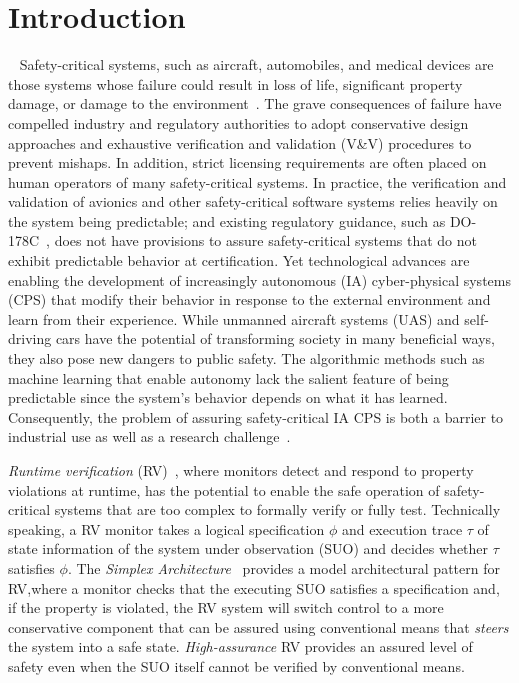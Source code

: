 \section{Introduction}~\label{sec:intro} Safety-critical systems, such
as aircraft, automobiles, and medical devices are those systems whose
failure could result in loss of life, significant property damage, or
damage to the environment~\cite{Knight2002}.  The grave consequences
of failure have compelled industry and regulatory authorities to adopt
conservative design approaches and exhaustive verification and
validation (V\&V) procedures to prevent mishaps. In addition, strict
licensing requirements are often placed on human operators of many
safety-critical systems.  In practice, the verification and validation
of avionics and other safety-critical software systems relies heavily
on the system  being predictable; and existing regulatory guidance, such as
DO-178C~\cite{DO178B}, does not have provisions to assure
safety-critical systems that do not exhibit predictable behavior at
certification.  Yet technological advances are enabling the
development of increasingly autonomous (IA) cyber-physical systems (CPS)
that modify their behavior in response to the external environment and
learn from their experience.  While unmanned aircraft systems (UAS)
and self-driving cars have the potential of transforming society in
many beneficial ways, they also pose new dangers to public safety. The
algorithmic methods such as machine learning that enable autonomy lack
the salient feature of being predictable since the system's behavior
depends on what it has learned.  Consequently, the problem of assuring
safety-critical IA CPS is both a barrier to industrial use  as well as a
research challenge~\cite{NRC14}.


\emph{Runtime verification} (RV)~\cite{monitors}, where monitors
detect and respond to property violations at runtime, has the
potential to enable the safe operation of safety-critical systems that
are too complex to formally verify or fully test.  Technically
speaking, a RV monitor takes a logical specification $\phi$ and
execution trace $\tau$ of state information of the system under
observation (SUO) and decides whether $\tau$ satisfies $\phi$. The
\emph{Simplex Architecture}~\cite{simplex} provides a model
architectural pattern for RV,where a monitor checks that the
executing SUO satisfies a specification and, if the property is
violated, the RV system will switch control to a more conservative
component that can be assured using conventional means that
\emph{steers} the system into a safe state.  \emph{High-assurance} RV
provides an assured level of safety even when the SUO itself cannot be
verified by conventional means.

